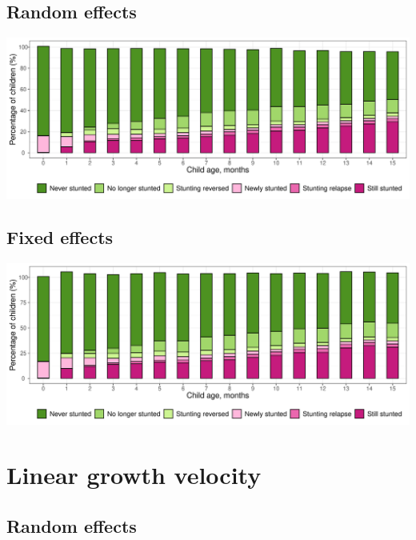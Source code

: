 \documentclass[
  9pt,
]{book}
\begin{document}
\hypertarget{random-effects-2}{%
\subsection{Random effects}\label{random-effects-2}}

\includegraphics[width=41.67in]{figures//stunting/fig-stunt-2-flow-overall--allage-re}

\hypertarget{fixed-effects-3}{%
\subsection{Fixed effects}\label{fixed-effects-3}}

\includegraphics[width=41.67in]{figures//stunting/fig-stunt-2-flow-overall--allage-fe}

\hypertarget{linear-growth-velocity-1}{%
\section{Linear growth velocity}\label{linear-growth-velocity-1}}

\hypertarget{random-effects-3}{%
\subsection{Random effects}\label{random-effects-3}}
\end{document}
